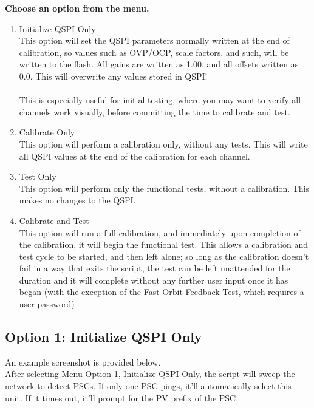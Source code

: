 \newpage \textbf{Choose an option from the menu.}
\begin{enumerate}
	\item Initialize QSPI Only\\
	This option will set the QSPI parameters normally written at the end of calibration, so values such as OVP/OCP, scale factors, and such, will be written to the flash. All gains are written as 1.00, and all offsets written as 0.0. This will overwrite any values stored in QSPI!\\\\This is especially useful for initial testing, where you may want to verify all channels work visually, before committing the time to calibrate and test.
	
	\item Calibrate Only\\
	This option will perform a calibration only, without any tests. This will write all QSPI values at the end of the calibration for each channel.
	
	\item Test Only\\
	This option will perform only the functional tests, without a calibration. This makes no changes to the QSPI. 
	
	\item Calibrate and Test\\
	This option will run a full calibration, and immediately upon completion of the calibration, it will begin the functional test. This allows a calibration and test cycle to be started, and then left alone; so long as the calibration doesn't fail in a way that exits the script, the test can be left unattended for the duration and it will complete without any further user input once it has began (with the exception of the Fast Orbit Feedback Test, which requires a user password)
\end{enumerate}

\newpage
\subsection{Option 1: Initialize QSPI Only}
An example screenshot is provided below.\\
After selecting Menu Option 1, Initialize QSPI Only, the script will sweep the network to detect PSCs. If only one PSC pings, it'll automatically select this unit. If it times out, it'll prompt for the PV prefix of the PSC.\\

